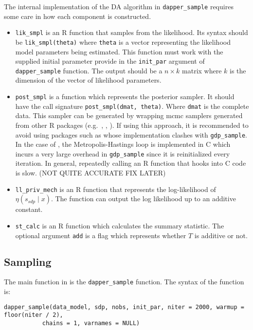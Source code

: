 The internal implementation of the DA algorithm in \texttt{dapper\_sample} requires
some care in how each component is constructed.

\begin{itemize}
\item
  \texttt{lik\_smpl} is an R function that samples from the likelihood. Its
  syntax should be \texttt{lik\_smpl(theta)} where \texttt{theta} is a vector
  representing the likelihood model parameters being estimated. This function
  must work with the supplied initial parameter provide in the \texttt{init\_par}
  argument of \texttt{dapper\_sample} function. The output should be a \(n \times k\) matrix
  where \(k\) is the dimension of the vector of likelihood parameters.
\item
  \texttt{post\_smpl} is a function which represents the posterior sampler. It should
  have the call signature \texttt{post\_smpl(dmat,\ theta)}. Where \texttt{dmat} is the
  complete data. This sampler can be generated by wrapping mcmc samplers generated from other R packages
  (e.g.~, , ).
  If using this approach, it is recommended to avoid using packages such as 
  whose implementation clashes with \texttt{gdp\_sample}. In the case of ,
  the Metropolis-Hastings loop is implemented in C which incurs a very large overhead
  in \texttt{gdp\_sample} since it is reinitialized every iteration. In general, repeatedly calling
  an R function that hooks into C code is slow. (NOT QUITE ACCURATE FIX LATER)
\item
  \texttt{ll\_priv\_mech} is an R function that represents the log-likelihood of
  \(\eta(s_{sdp} \mid x)\). The function can output the log likelihood
  up to an additive constant.
\item
  \texttt{st\_calc} is an R function which calculates the summary statistic. The optional
  argument \texttt{add} is a flag which represents whether \(T\) is additive or not.
\end{itemize}

\hypertarget{sampling}{%
\subsection{Sampling}\label{sampling}}

The main function in  is the \texttt{dapper\_sample} function. The syntax of the function is:

\begin{verbatim}
dapper_sample(data_model, sdp, nobs, init_par, niter = 2000, warmup = floor(niter / 2),
           chains = 1, varnames = NULL)
\end{verbatim}

